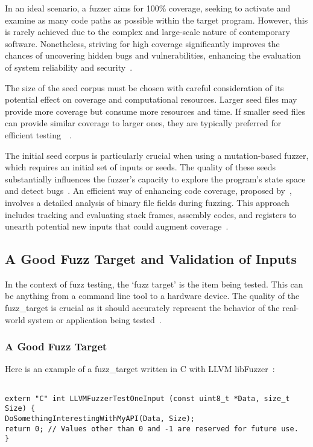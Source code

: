 In an ideal scenario, a fuzzer aims for 100\% coverage, seeking to activate and
examine as many code paths as possible within the target program. However, this
is rarely achieved due to the complex and large-scale nature of contemporary
software. Nonetheless, striving for high coverage significantly improves the
chances of uncovering hidden bugs and vulnerabilities, enhancing the evaluation
of system reliability and security~\cite{godefroid2012sage}.

The size of the seed corpus must be chosen with careful consideration of
its potential effect on coverage and computational resources. Larger seed files
may provide more coverage but consume more resources and time. If smaller seed
files can provide similar coverage to larger ones, they are typically preferred
for efficient testing~\cite{liang2018fuzzing}~\cite{jurczyk2016effective}.

The initial seed corpus is particularly crucial when using a mutation-based
fuzzer, which requires an initial set of inputs or \gls{seeds}. The quality of these
\gls{seeds} substantially influences the fuzzer's capacity to explore the program's
state space and detect bugs~\cite{miller2007analysis}. An efficient way of
enhancing code coverage, proposed by~, involves a
detailed analysis of binary file fields during fuzzing. This approach includes
tracking and evaluating stack frames, assembly codes, and registers to unearth
potential new inputs that could augment coverage~\cite{kim2011efficient}.

\subsection{A Good Fuzz Target and Validation of Inputs}
In the context of fuzz testing, the `fuzz target' is the item being tested.
This can be anything from a command line tool to a hardware device. The quality
of the \gls{fuzz_target} is crucial as it should accurately represent the behavior of
the real-world system or application being tested~\cite{238602}.

\subsubsection{A Good Fuzz Target}
Here is an example of a \gls{fuzz_target} written in C with
LLVM libFuzzer~\cite{libFuzze17:online}:

\begin{verbatim}

extern "C" int LLVMFuzzerTestOneInput (const uint8_t *Data, size_t Size) {
DoSomethingInterestingWithMyAPI(Data, Size);
return 0; // Values other than 0 and -1 are reserved for future use.
}

\end{verbatim}


